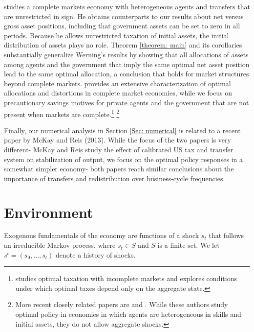 \documentclass[thmsb,11pt]{article}
\begin{document}
\citet{Wer07a} studies a complete markets economy with heterogeneous agents
and transfers that are unrestricted in sign. He obtains counterparts to our
results about net versus gross asset positions, including that government
assets can be set to zero in all periods. Because he allows unrestricted
taxation of initial assets, the initial distribution of assets plays no
role. Theorem \ref{theorem: main} and its corollaries substantially
generalize Werning's results by showing that all allocations of assets among
agents and the government that imply the same optimal net asset position
lead to the same optimal allocation, a conclusion that holds for market
structures beyond complete markets. \citet{Wer07a} provides an extensive
characterization of optimal allocations and distortions in complete market
economies, while we focus on precautionary savings motives for private
agents and the government that are not present when markets are complete.\footnote{%
\cite{Werning2012} studies optimal taxation with incomplete markets and explores
conditions under which optimal taxes depend only on the aggregate state.}
\footnote{%
More recent closely related papers are \citet{Azzimonti2008,Azzimonti2008a} and \citet{Correia2010}. While these authors study optimal policy in
 economies in which agents are heterogeneous in skills and initial assets, they
  do not allow aggregate shocks.}

  Finally, our numerical analysis in Section \ref{Sec: numerical} is related to a recent paper by McKay and Reis (2013). While the focus of the two papers is very different- McKay and Reis study the effect of calibrated US tax and transfer system on stabilization of output, we focus on the optimal policy responses in a somewhat simpler economy- both papers reach similar conclusions about the importance of transfers and redistribution over business-cycle frequencies.
  
  

\section{Environment\label{Sec: environment}}

\smallskip  %
Exogenous fundamentals
of the
economy are  functions of a shock  $s_{t}$  that follows an irreducible Markov process, where $s_{t}\in S$ and $S$ is a finite set. We let $s^{t}=\left(
s_{0},...,s_{t}\right) $ denote a history of shocks.
\end{document}
